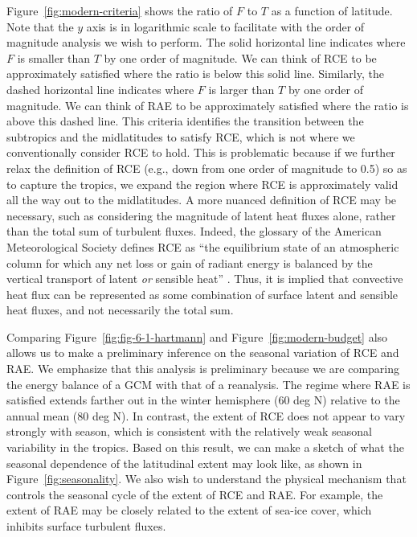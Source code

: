 \documentclass{article}
\begin{document}
Figure~\ref{fig:modern-criteria} shows the ratio of $F$ to $T$ as a function of latitude. Note that the $y$ axis is in logarithmic scale to facilitate with the order of magnitude analysis we wish to perform. The solid horizontal line indicates where $F$ is smaller than $T$ by one order of magnitude. We can think of RCE to be approximately satisfied where the ratio is below this solid line. Similarly, the dashed horizontal line indicates where $F$ is larger than $T$ by one order of magnitude. We can think of RAE to be approximately satisfied where the ratio is above this dashed line. This criteria identifies the transition between the subtropics and the midlatitudes to satisfy RCE, which is not where we conventionally consider RCE to hold. This is problematic because if we further relax the definition of RCE (e.g., down from one order of magnitude to 0.5) so as to capture the tropics, we expand the region where RCE is approximately valid all the way out to the midlatitudes. A more nuanced definition of RCE may be necessary, such as considering the magnitude of latent heat fluxes alone, rather than the total sum of turbulent fluxes. Indeed, the glossary of the American Meteorological Society defines RCE as ``the equilibrium state of an atmospheric column for which any net loss or gain of radiant energy is balanced by the vertical transport of latent \textit{or} sensible heat'' \citep{ams-glossary}. Thus, it is implied that convective heat flux can be represented as some combination of surface latent and sensible heat fluxes, and not necessarily the total sum.

Comparing Figure~\ref{fig:fig-6-1-hartmann} and Figure~\ref{fig:modern-budget} also allows us to make a preliminary inference on the seasonal variation of RCE and RAE. We emphasize that this analysis is preliminary because we are comparing the energy balance of a GCM with that of a reanalysis. The regime where RAE is satisfied extends farther out in the winter hemisphere (60 deg N) relative to the annual mean (80 deg N). In contrast, the extent of RCE does not appear to vary strongly with season, which is consistent with the relatively weak seasonal variability in the tropics. Based on this result, we can make a sketch of what the seasonal dependence of the latitudinal extent may look like, as shown in Figure~\ref{fig:seasonality}. We also wish to understand the physical mechanism that controls the seasonal cycle of the extent of RCE and RAE. For example, the extent of RAE may be closely related to the extent of sea-ice cover, which inhibits surface turbulent fluxes.
\end{document}
